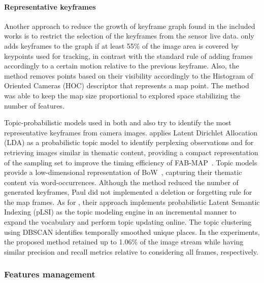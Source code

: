 \paragraph{Representative keyframes}

Another approach to reduce the growth of keyframe graph found in the included works is to restrict the selection of the keyframes from the sensor live data.
\cite{pirker-et-al:2011:6048253} only adds keyframes to the graph if at least 55\% of the image area is covered by keypoints used for tracking, in contrast with the standard rule of adding frames accordingly to a certain motion relative to the previous keyframe. Also, the method removes points based on their visibility accordingly to the Histogram of Oriented Cameras (HOC) descriptor that represents a map point. The method was able to keep the map size proportional to explored space stabilizing the number of features.

Topic-probabilistic models used in both \cite{paul-newman:2013:0278364913509859} and \cite{murphy-sibley:2014:6907022} also try to identify the most representative keyframes from camera images.
\cite{paul-newman:2013:0278364913509859} applies Latent Dirichlet Allocation (LDA) as a probabilistic topic model to identify perplexing observations and for retrieving images similar in thematic content, providing a compact representation of the sampling set to improve the timing efficiency of FAB-MAP~\parencite{discussion:fab-map}. Topic models provide a low-dimensional representation of BoW~\parencite{discussion:bow}, capturing their thematic content via word-occurrences. Although the method reduced the number of generated keyframes, Paul did not implemented a deletion or forgetting rule for the map frames.
As for \cite{murphy-sibley:2014:6907022}, their approach implements probabilistic Latent Semantic Indexing (pLSI) as the topic modeling engine in an incremental manner to expand the vocabulary and perform topic updating online. The topic clustering using DBSCAN identifies temporally smoothed unique places. In the experiments, the proposed method retained up to 1.06\% of the image stream while having similar precision and recall metrics relative to considering all frames, respectively.



\subsubsection{Features management}

